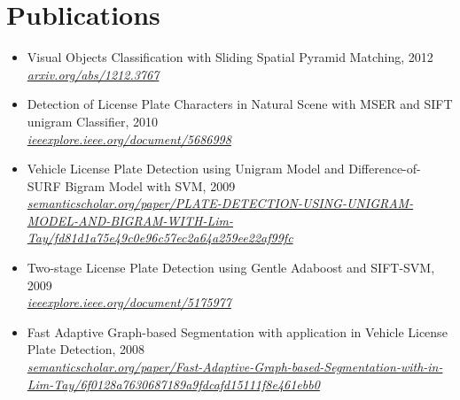 \documentclass[12pt,twoside,a4paper]{article}
\newcommand{\resumeSubHeadingListStart}{\begin{itemize}[leftmargin=*]}
\newcommand{\resumeSubHeadingListEnd}{\end{itemize}}
\begin{document}
\section{Publications}
 \resumeSubHeadingListStart
   \item{
     {Visual Objects Classification with Sliding Spatial Pyramid Matching, 2012}{\\\textit{\href{https://arxiv.org/abs/1212.3767}{arxiv.org/abs/1212.3767}}}
   }
   \item{
     {Detection of License Plate Characters in Natural Scene with MSER and SIFT unigram Classifier, 2010}{\\\textit{\href{https://ieeexplore.ieee.org/document/5686998}{ieeexplore.ieee.org/document/5686998}}}
   }
   \item{
     {Vehicle License Plate Detection using Unigram Model and Difference-of-SURF Bigram Model with SVM, 2009}{\\\textit{\href{https://www.semanticscholar.org/paper/PLATE-DETECTION-USING-UNIGRAM-MODEL-AND-BIGRAM-WITH-Lim-Tay/fd81d1a75e49c0e96c57ec2a64a259ee22af99fc}{semanticscholar.org/paper/PLATE-DETECTION-USING-UNIGRAM-MODEL-AND-BIGRAM-WITH-Lim-Tay/fd81d1a75e49c0e96c57ec2a64a259ee22af99fc}}}
   }
   \item{
     {Two-stage License Plate Detection using Gentle Adaboost and SIFT-SVM, 2009}{\\\textit{\href{https://ieeexplore.ieee.org/document/5175977}{ieeexplore.ieee.org/document/5175977}}}
   }
   \item{
     {Fast Adaptive Graph-based Segmentation with application in Vehicle License Plate Detection, 2008}{\\\textit{\href{https://www.semanticscholar.org/paper/Fast-Adaptive-Graph-based-Segmentation-with-in-Lim-Tay/6f0128a7630687189a9fdcafd15111f8e461ebb0}{semanticscholar.org/paper/Fast-Adaptive-Graph-based-Segmentation-with-in-Lim-Tay/6f0128a7630687189a9fdcafd15111f8e461ebb0}}}
   }
 \resumeSubHeadingListEnd

\end{document}
